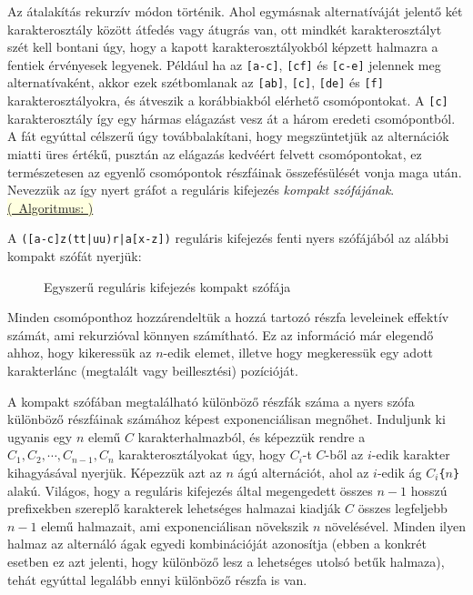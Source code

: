 \documentclass[
    parspace,
    noindent,
    nohyp,
]{elteiktdk}[2023/04/10]
\newcommand{\todoref}[1]{\todo[inline, noinlinepar, color=red, textcolor=white, inlinewidth=0.6cm, caption={#1}]{\large \textbf{×}}}
\newcommand{\algorithmref}[1]{\hyperref[algorithm:#1]{\colorbox{lightyellow}{%
(\textrightarrow~Algoritmus: \nameref*{algorithm:#1})}}}
\newcommand{\regextt}[1]{\texttt{\colorbox{verylightgray}{#1}}}
\begin{document}
Az átalakítás rekurzív módon történik.
Ahol egymásnak alternatíváját jelentő két karakterosztály között átfedés vagy átugrás van,
ott mindkét karakterosztályt szét kell bontani úgy,
hogy a kapott karakterosztályokból képzett halmazra a fentiek érvényesek legyenek.
Például ha az \regextt{[a-c]}, \regextt{[cf]} és \regextt{[c-e]} jelennek meg alternatívaként,
akkor ezek szétbomlanak az \regextt{[ab]}, \regextt{[c]}, \regextt{[de]} és \regextt{[f]}
karakterosztályokra, és átveszik a korábbiakból elérhető csomópontokat.
A \regextt{[c]} karakterosztály így egy hármas elágazást vesz át a három eredeti csomópontból.
A fát egyúttal célszerű úgy továbbalakítani, hogy megszüntetjük az alternációk miatti üres értékű,
pusztán az elágazás kedvéért felvett csomópontokat,
ez természetesen az egyenlő csomópontok részfáinak összefésülését vonja maga után.
Nevezzük az így nyert gráfot a reguláris kifejezés \textit{kompakt szófájának}.
\algorithmref{regex_wordtree_create_compact}

A \regextt{([a-c]z(tt|uu)r|a[x-z])} reguláris kifejezés fenti nyers szófájából
az alábbi kompakt szófát nyerjük:

\begin{figure}[H]
\centering

\caption{Egyszerű reguláris kifejezés kompakt szófája}
\end{figure}

Minden csomóponthoz hozzárendeltük a hozzá tartozó részfa leveleinek effektív számát,
ami rekurzióval könnyen számítható.
Ez az információ már elegendő ahhoz, hogy kikeressük az $n$-edik elemet,
illetve hogy megkeressük egy adott karakterlánc (megtalált vagy beillesztési) pozícióját.

A kompakt szófában megtalálható különböző részfák száma
a nyers szófa különböző részfáinak számához képest exponenciálisan megnőhet.
Induljunk ki ugyanis egy $n$ elemű $C$ karakterhalmazból,
és képezzük rendre a $C_1, C_2, \cdots, C_{n-1}, C_n$ karakterosztályokat úgy,
hogy $C_i$-t $C$-ből az $i$-edik karakter kihagyásával nyerjük.
Képezzük azt az $n$ ágú alternációt,
ahol az $i$-edik ág $C_i$\texttt{\{}$n$\texttt{\}} alakú.
Világos, hogy a reguláris kifejezés által megengedett összes $n-1$ hosszú prefixekben
szereplő karakterek lehetséges halmazai kiadják
$C$ összes legfeljebb $n-1$ elemű halmazait,
ami exponenciálisan növekszik $n$ növelésével.
Minden ilyen halmaz az alternáló ágak egyedi kombinációját azonosítja
(ebben a konkrét esetben ez azt jelenti, hogy különböző lesz a lehetséges utolsó betűk halmaza),
tehát egyúttal legalább ennyi különböző részfa is van.
\todoref{Paraméteres reguláris kifejezések notációja?}
\end{document}

